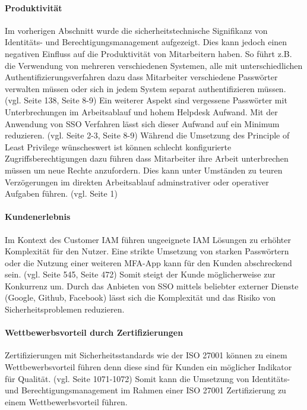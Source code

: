 \documentclass[11pt]{article}
\begin{document}
\paragraph{Produktivität}
Im vorherigen Abschnitt wurde die sicherheitstechnische Signifikanz von Identitäts- und Berechtigungsmanagement aufgezeigt. Dies kann jedoch einen negativen Einfluss auf die Produktivität von Mitarbeitern haben. So führt z.B. die Verwendung von mehreren verschiedenen Systemen, alle mit unterschiedlichen Authentifizierungsverfahren dazu dass Mitarbeiter verschiedene Passwörter verwalten müssen oder sich in jedem System separat authentifizieren müssen. (vgl. \cite{radha2012survey} Seite 138, \cite{haag2012selecting} Seite 8-9) Ein weiterer Aspekt sind vergessene Passwörter mit Unterbrechungen im Arbeitsablauf und hohem Helpdesk Aufwand. Mit der Anwendung von SSO Verfahren lässt sich dieser Aufwand auf ein Minimum reduzieren. (vgl. \cite{thakur2015user} Seite 2-3, \cite{haag2012selecting} Seite 8-9) Während die Umsetzung des Principle of Least Privilege wünscheswert ist können schlecht konfigurierte Zugriffsberechtigungen dazu führen dass Mitarbeiter ihre Arbeit unterbrechen müssen um neue Rechte anzufordern. Dies kann unter Umständen zu teuren Verzögerungen im direkten Arbeitsablauf adminstrativer oder operativer Aufgaben führen. (vgl. \cite{weishaupl2015towards} Seite 1)
\paragraph{Kundenerlebnis}
Im Kontext des Customer IAM führen ungeeignete IAM Lösungen zu erhöhter Komplexität für den Nutzer. Eine strikte Umsetzung von starken Passwörtern oder die Nutzung einer weiteren MFA-App kann für den Kunden abschreckend sein. (vgl. \cite{azhar2014economics} Seite 545, \cite{liveretos2022customer} Seite 472) Somit steigt der Kunde möglicherweise zur Konkurrenz um. Durch das Anbieten von SSO mittels beliebter externer Dienste (Google, Github, Facebook) lässt sich die Komplexität und das Risiko von Sicherheitsproblemen reduzieren.
\paragraph{Wettbewerbsvorteil durch Zertifizierungen}
Zertifizierungen mit Sicherheitsstandards wie der ISO 27001 können zu einem Wettbewerbsvorteil führen denn diese sind für Kunden ein möglicher Indikator für Qualität. (vgl. \cite{dobrin2015quality} Seite 1071-1072) Somit kann die Umsetzung von Identitäts- und Berechtigungsmanagement im Rahmen einer ISO 27001 Zertifizierung zu einem Wettbewerbsvorteil führen.
\end{document}
